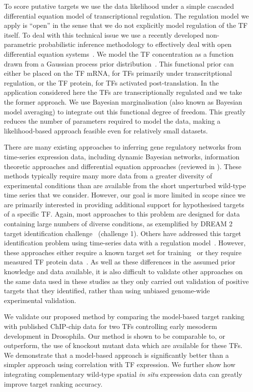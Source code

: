 \documentclass{pnastwo}
\begin{document}
\begin{article}
To score putative targets we use the data likelihood under a simple
cascaded differential equation model of transcriptional regulation. The regulation model
we apply is ``open'' in the sense that we do not explicitly model regulation of the TF
itself. To deal with this technical issue we use a recently developed
non-parametric probabilistic inference methodology to
effectively deal with open differential equation
systems~\cite{Gao2008}. We model the TF concentration as a function
drawn from a Gaussian process prior distribution~\cite{Rasmussen2006}. This functional prior can either be placed
on the TF mRNA, for TFs primarily under transcritptional regulation,
or the TF protein, for TFs activated post-translation. In the
application considered here the TFs are transcriptionally regulated
and we take the former approach. We use Bayesian marginalisation (also
known as Bayesian model averaging) to
integrate out this functional degree of freedom. This greatly reduces the
number of parameters required to model the data, making a
likelihood-based approach feasible even for relatively small
datasets. 

There are many existing approaches to inferring gene regulatory networks from
time-series expression data, including dynamic Bayesian networks,
information theoretic approaches and differential equation approaches
(reviewed in \cite{Bansal2007a}). These methods typically require many
more data from a greater diversity of experimental conditions than are
available from the short unperturbed wild-type time series that we
consider. However, our goal is more limited in scope since
we are primarily interested in providing additional support for hypothesised
targets of a specific TF. Again, most approaches to this problem are
designed for data containing large numbers of diverse conditions, as
exemplified by DREAM 2 target identification
challenge~\cite{Stolovitzky2007} (challenge 1). Others
have addressed this target identification problem using time-series
data with a regulation model~\cite{Barenco2006a,Gatta2008}. However,
these approaches either require a known target set for training~\cite{Barenco2006a} or
they require measured TF protein data~\cite{Gatta2008}. As well as
these differences in the assumed prior knowledge and data available,
it is also difficult to validate other approaches on the same data used in these
studies as they only carried out validation of positive targets
that they identified, rather than using unbiased genome-wide
experimental validation. 

We validate our proposed method by comparing the model-based target
ranking with published ChIP-chip data for two TFs controlling early
mesoderm development in Drosophila. Our method is shown to be comparable
to, or outperform, the use of knockout mutant data which are available
for these TFs. We demonstrate that a model-based approach is significantly
better than a simpler approach using correlation with TF
expression. We further show how integrating complementary wild-type spatial
{\em in situ} expression data can greatly improve target ranking accuracy. 


\end{article}
\end{document}
